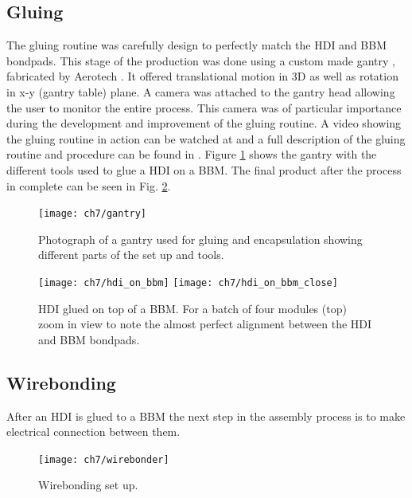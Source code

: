 \subsection{Gluing}
The gluing routine was carefully design to perfectly match the HDI and BBM bondpads. This stage of the production was done using a custom made gantry , fabricated by Aerotech \cite{aerotech}. It offered translational motion in 3D as well as rotation in x-y (gantry table) plane. A camera was attached to the gantry head allowing the user to monitor the entire process. This camera was of particular importance during the development and improvement of the gluing routine. A video showing the gluing routine in action can be watched at \cite{gluing_frank} and a full description of the gluing routine and procedure can be found in \cite{and_the}. Figure \ref{fig:gantry} shows the gantry with the different tools used to glue a HDI on a BBM. The final product after the process in complete can be seen in Fig. \ref{fig:hdionbbm}.

\begin{figure}[!h]
  \centering
  \texttt{[image: ch7/gantry]}
  \caption[Gluing and encapsulation set up]{Photograph of a gantry used for gluing and encapsulation showing different parts of the set up and tools. }\label{fig:gantry}
\end{figure}

\begin{figure}[!h]
  \centering
  \texttt{[image: ch7/hdi\_on\_bbm]}
  \texttt{[image: ch7/hdi\_on\_bbm\_close]}
  \caption[Gluing result]{HDI glued on top of a BBM. For a batch of four modules (top) zoom in view to note the almost perfect alignment between the HDI and BBM bondpads.}\label{fig:hdionbbm}
\end{figure}








\subsection{Wirebonding}
After an HDI is glued to a BBM the next step in the assembly process is to make electrical connection between them. 

\begin{figure}[!h]
  \centering
  \texttt{[image: ch7/wirebonder]}
  \caption[wirebonder machine]{Wirebonding set up.}\label{fig:wirebonder}
\end{figure}


